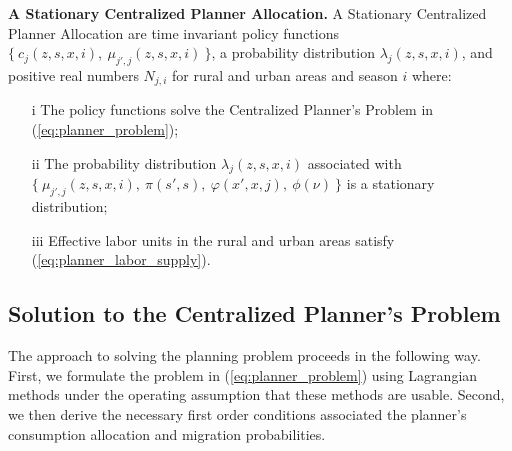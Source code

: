 \documentclass[12pt,pdftex]{article}
\begin{document}
\begin{onehalfspacing}
\textbf{A Stationary Centralized Planner Allocation.}  A Stationary Centralized Planner Allocation are time invariant policy functions $\{\ c_{j}(z, s, x, i),\ \mu_{j',j}(z, s, x, i) \ \}$, a probability distribution $\lambda_{j}(z, s, x, i)$, and positive real numbers $N_{j,i}$ for rural and urban areas and season $i$ where:
\begin{itemize}
\item[i] The policy functions solve the Centralized Planner's Problem in (\ref{eq:planner_problem});
\item[ii] The probability distribution $\lambda_{j}(z, s, x, i)$ associated with $\{\ \mu_{j',j}(z, s, x, i), \ \pi(s',s), \ \varphi(x',x, j), \ \phi(\nu) \ \}$ is a stationary distribution;
\item[iii] Effective labor units in the rural and urban areas satisfy (\ref{eq:planner_labor_supply}).
\end{itemize}

\subsection{Solution to the Centralized Planner's Problem}

The approach to solving the planning problem proceeds in the following way. First, we formulate the problem in (\ref{eq:planner_problem}) using Lagrangian methods under the operating assumption that these methods are usable. Second, we then derive the necessary first order conditions associated the planner's consumption allocation and migration probabilities.


\end{onehalfspacing}
\end{document}
